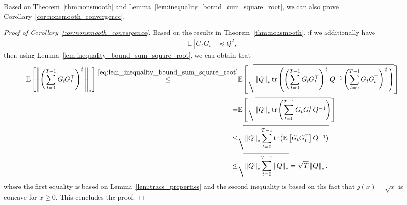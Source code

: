 \documentclass{article}
\theoremstyle{remark}
\newcommand{\Norm}[1]{\left\|#1\right\|}
\newcommand{\tr}[1]{{\rm tr}\left( #1 \right)}
\newcommand{\EE}{\mathbb{E}}
\begin{document}
Based on Theorem~\ref{thm:nonsmooth} and Lemma~\ref{lem:inequality_bound_sum_square_root}, we can also prove Corollary~\ref{cor:nonsmooth_convergence}.
\begin{proof}[Proof of Corollary~\ref{cor:nonsmooth_convergence}]
Based on the results in Theorem~\ref{thm:nonsmooth}, if we additionally have
\begin{align*}
    \EE\left[ G_t G_t^\top \right] \preceq Q^2 ,
\end{align*}
then using Lemma~\ref{lem:inequality_bound_sum_square_root}, we can obtain that
\begin{align*}
        \EE\left[ \Norm{\left( \sum_{t=0}^{T-1} G_t G_t^\top\right)^{\frac{1}{2}}}_* \right] \overset{\eqref{eq:lem_inequality_bound_sum_square_root}}{\le}& \EE\left[ \sqrt{\Norm{Q}_* \tr{\left( \sum_{t=0}^{T-1} G_t G_t^\top \right)^{\frac{1}{2}} Q^{-1} \left( \sum_{t=0}^{T-1} G_tG_t^\top \right)^{\frac{1}{2}}}} \right] \\
        =&
        \EE\left[ \sqrt{\Norm{Q}_* \tr{ \sum_{t=0}^{T-1} G_tG_t^\top Q^{-1} }} \right] \\
        \le&
        \sqrt{\Norm{Q}_* \sum_{t=0}^{T-1} \tr{ \EE\left[ G_tG_t^\top \right] Q^{-1} }} \\
        \le&
        \sqrt{\Norm{Q}_* \sum_{t=0}^{T-1} \Norm{Q}_*} = \sqrt{T} \Norm{Q}_*,
\end{align*}
where the first equality is based on Lemma~\ref{lem:trace_properties} and the second inequality is based on the fact that $g(x) = \sqrt{x}$ is concave for $x \ge 0$. This concludes the proof.
\end{proof}
\end{document}
